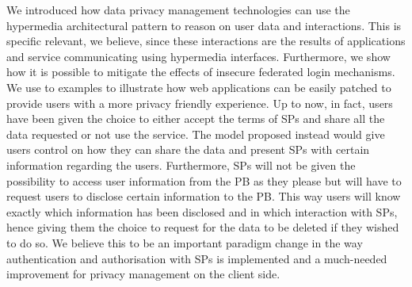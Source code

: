 We introduced how data privacy management technologies can use the hypermedia architectural pattern to reason on user data and interactions. This is specific relevant, we believe, since these interactions are the results of applications and service communicating using hypermedia interfaces. 
Furthermore, we show how it is possible to mitigate the effects of insecure federated login mechanisms. We use to examples to illustrate how web applications can be easily patched to provide users with a more privacy friendly experience. Up to now, in fact, users have been given the choice to either accept the terms of SPs and share all the data requested or not use the service. The model proposed instead would give users control on how they can share the data and present SPs with certain information regarding the users. 
Furthermore, SPs will not be given the possibility to access user information from the PB as they please but will have to request users to disclose certain information to the PB. This way users will know exactly which information has been disclosed and in which interaction with SPs, hence giving them the choice to request for the data to be deleted if they wished to do so.
We believe this to be an important paradigm change in the way authentication and authorisation with SPs is implemented and a much-needed improvement for privacy management on the client side.